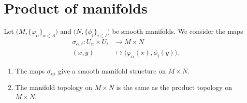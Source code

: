 \section{Product of manifolds}

\begin{propositionDef}      \label{DEFooYOLXooDPrnHa}
	Let \( \big( M,\{ \varphi_{\alpha} \}_{\alpha\in \Lambda} \big)\) and \( \big( N,\{ \phi_i \}_{i\in I} \big)\) be smooth manifolds. We consider the maps
	\begin{equation}
		\begin{aligned}
			\sigma_{\alpha,i}\colon U_{\alpha}\times U_i & \to M\times N                                       \\
			(x,y)                                        & \mapsto \big( \varphi_{\alpha}(x), \phi_i(y) \big).
		\end{aligned}
	\end{equation}
	\begin{enumerate}
		\item
		      The maps \( \sigma_{\alpha i}\) give a smooth manifold structure on \( M\times N\).
		\item
		      The manifold topology on \( M\times N\) is the same as the product topology on \( M\times N\).
	\end{enumerate}
\end{propositionDef}


